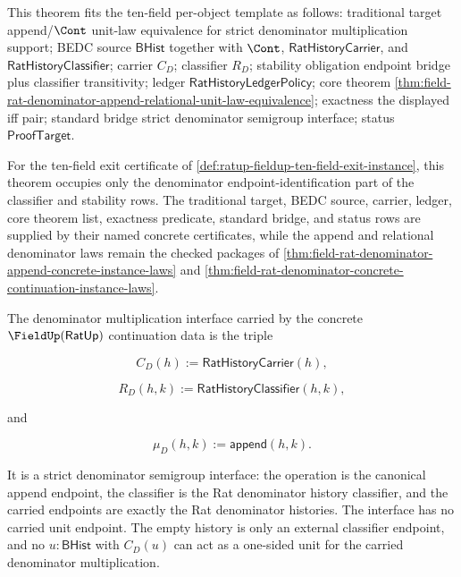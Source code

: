 This theorem fits the ten-field per-object template as follows: traditional
target append/$\Cont$ unit-law equivalence for strict denominator multiplication
support; BEDC source $\mathsf{BHist}$ together with $\Cont$,
$\mathsf{RatHistoryCarrier}$, and $\mathsf{RatHistoryClassifier}$; carrier
$C_D$; classifier $R_D$; stability obligation endpoint bridge plus classifier
transitivity; ledger $\mathsf{RatHistoryLedgerPolicy}$; core theorem
\autoref{thm:field-rat-denominator-append-relational-unit-law-equivalence};
exactness the displayed iff pair; standard bridge strict denominator semigroup
interface; status $\mathsf{ProofTarget}$.

For the ten-field exit certificate of
\autoref{def:ratup-fieldup-ten-field-exit-instance}, this theorem occupies only
the denominator endpoint-identification part of the classifier and stability
rows. The traditional target, BEDC source, carrier, ledger, core theorem list,
exactness predicate, standard bridge, and status rows are supplied by their
named concrete certificates, while the append and relational denominator laws
remain the checked packages of
\autoref{thm:field-rat-denominator-append-concrete-instance-laws} and
\autoref{thm:field-rat-denominator-concrete-continuation-instance-laws}.

\begin{definition}
\label{def:field-rat-denominator-strict-semigroup-interface}
The denominator multiplication interface carried by the concrete
$\FieldUp(\mathsf{RatUp})$ continuation data is the triple

$$
C_D(h):=\mathsf{RatHistoryCarrier}(h),
$$

$$
R_D(h,k):=\mathsf{RatHistoryClassifier}(h,k),
$$

and

$$
\mu_D(h,k):=\mathsf{append}(h,k).
$$

It is a strict denominator semigroup interface: the operation is the canonical
append endpoint, the classifier is the Rat denominator history classifier, and
the carried endpoints are exactly the Rat denominator histories. The interface
has no carried unit endpoint. The empty history is only an external classifier
endpoint, and no $u:\mathsf{BHist}$ with $C_D(u)$ can act as a one-sided unit
for the carried denominator multiplication.
\end{definition}

